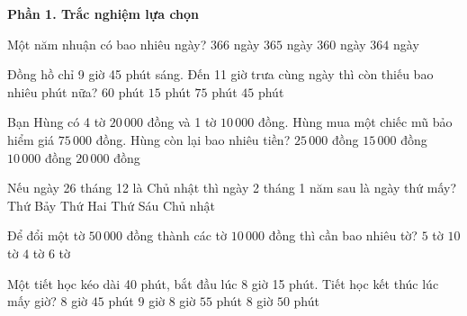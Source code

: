 \textbf{Phần 1. Trắc nghiệm lựa chọn}

\begin{ex} %
Một năm nhuận có bao nhiêu ngày?
\choice
{\True $366$ ngày}
{$365$ ngày}
{$360$ ngày}
{$364$ ngày}
\end{ex}

\begin{ex} %
Đồng hồ chỉ 9 giờ 45 phút sáng. Đến 11 giờ trưa cùng ngày thì còn thiếu bao nhiêu phút nữa?
\choice
{$60$ phút}
{$15$ phút}
{\True $75$ phút}
{$45$ phút}
\end{ex}

\begin{ex} %
Bạn Hùng có 4 tờ $20\,000$ đồng và 1 tờ $10\,000$ đồng. Hùng mua một chiếc mũ bảo hiểm giá $75\,000$ đồng. Hùng còn lại bao nhiêu tiền?
\choice
{$25\,000$ đồng}
{\True $15\,000$ đồng}
{$10\,000$ đồng}
{$20\,000$ đồng}
\end{ex}

\begin{ex} %
Nếu ngày 26 tháng 12 là Chủ nhật thì ngày 2 tháng 1 năm sau là ngày thứ mấy?
\choice
{Thứ Bảy}
{Thứ Hai}
{Thứ Sáu}
{\True Chủ nhật}
\end{ex}

\begin{ex} %
Để đổi một tờ $50\,000$ đồng thành các tờ $10\,000$ đồng thì cần bao nhiêu tờ?
\choice
{\True $5$ tờ}
{$10$ tờ}
{$4$ tờ}
{$6$ tờ}
\end{ex}

\begin{ex} %
Một tiết học kéo dài 40 phút, bắt đầu lúc 8 giờ 15 phút. Tiết học kết thúc lúc mấy giờ?
\choice
{$8$ giờ $45$ phút}
{$9$ giờ}
{\True $8$ giờ $55$ phút}
{$8$ giờ $50$ phút}
\end{ex}

